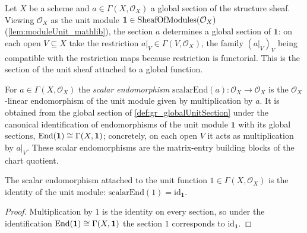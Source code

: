 \begin{definition}\leanok
  \label{def:gr_globalUnitSection}
  Let \(X\) be a scheme and \(a \in \Gamma(X, \mathcal{O}_X)\) a global section of
  the structure sheaf. Viewing \(\mathcal{O}_X\) as the unit module
  \(\mathbf{1} \in \mathrm{SheafOfModules}(\mathcal{O}_X)\) (\cref{lem:moduleUnit_mathlib}), the
  section \(a\) determines a global section of \(\mathbf{1}\): on each open
  \(V \subseteq X\) take the restriction \(a|_V \in \Gamma(V, \mathcal{O}_X)\), the
  family \((a|_V)_V\) being compatible with the restriction maps because
  restriction is functorial. This is the section of the unit sheaf attached to a
  global function.
\end{definition}

\begin{definition}\leanok
  \label{def:gr_scalarEnd}
  For \(a \in \Gamma(X, \mathcal{O}_X)\) the \emph{scalar endomorphism}
  \(\mathrm{scalarEnd}(a) : \mathcal{O}_X \to \mathcal{O}_X\) is the
  \(\mathcal{O}_X\)-linear endomorphism of the unit module given by multiplication
  by \(a\). It is obtained from the global section of \cref{def:gr_globalUnitSection}
  under the canonical identification of endomorphisms of the unit module
  \(\mathbf{1}\) with its global sections, \(\operatorname{End}(\mathbf{1}) \cong
  \Gamma(X, \mathbf{1})\); concretely, on each open \(V\) it acts as
  multiplication by \(a|_V\). These scalar endomorphisms are the matrix-entry
  building blocks of the chart quotient.
\end{definition}

\begin{lemma}\leanok
  \label{lem:gr_scalarEnd_one}
  The scalar endomorphism attached to the unit function \(1 \in
  \Gamma(X, \mathcal{O}_X)\) is the identity of the unit module:
  \(\mathrm{scalarEnd}(1) = \mathrm{id}_{\mathbf{1}}\).
\end{lemma}

\begin{proof}
  Multiplication by \(1\) is the identity on every section, so under the
  identification \(\operatorname{End}(\mathbf{1}) \cong \Gamma(X, \mathbf{1})\) the section \(1\)
  corresponds to \(\mathrm{id}_{\mathbf{1}}\).
\end{proof}

